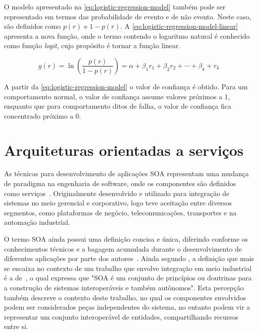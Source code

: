 O modelo apresentado na \cref{eq:logistic-regression-model} também pode ser representado em termos
das probabilidade de evento e de não evento. Neste caso, são definidos como $p(r)$ e $1 - p(r)$. A
\cref{eq:logistic-regression-model-linear} apresenta a nova função, onde o termo contendo o
logaritmo natural é conhecido como função \emph{logit}, cujo propósito é tornar a função linear.

\begin{equation}
  g(r) =
  \ln \left ( \frac{p(r)}{1 - p(r)} \right ) =
  \alpha + \beta_{1} r_{1} + \beta_{2} r_{2} + \cdots + \beta_{k} + r_{k}
  \label{eq:logistic-regression-model-linear}
\end{equation}

A partir da \cref{eq:logistic-regression-model} o valor de confiança é obtido. Para um comportamento
normal, o valor de confiança assume valores próximos a \num{1}, enquanto que para comportamento
ditos de falha, o valor de confiança fica concentrado próximo a \num{0}.


\section{Arquiteturas orientadas a serviços}

As técnicas para desenvolvimento de aplicações \gls{SOA} representam uma mudança de paradigma na
engenharia de software, onde os componentes são definidos como serviços~\cite{ramollari2007survey}.
Originalmente desenvolvido e utilizado para integração de sistemas no meio gerencial e corporativo,
logo teve aceitação entre diversos segmentos, como plataformas de negócio, telecomunicações,
transportes e na automação industrial.

O termo \gls{SOA} ainda possui uma definição concisa e única, diferindo conforme os conhecimentos
técnicos e a bagagem acumulada durante o desenvolvimento de diferentes aplicações por parte dos
autores~\cite{candido2013soa}. Ainda segundo \cite{candido2013soa}, a definição que mais se encaixa
no contexto de um trabalho que envolve integração em meio industrial é a
de~\cite{jammes2005service}, o qual expressa que "\gls{SOA} é um conjunto de princípios ou doutrinas
para a construção de sistemas interoperáveis e também autônomos". Esta percepção também descreve o
contexto deste trabalho, no qual os componentes envolvidos podem ser considerados peças
independentes do sistema, no entanto podem vir a representar um conjunto interoperável de entidades,
compartilhando recursos entre si.

